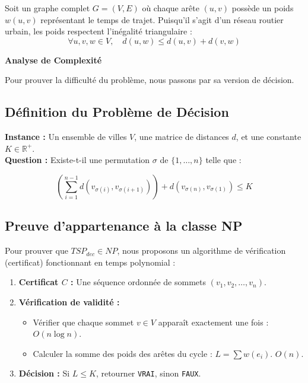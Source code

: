\noindent Soit un graphe complet $G = (V, E)$ où chaque arête $(u, v)$ possède un poids $w(u, v)$ représentant le temps de trajet. Puisqu'il s'agit d'un réseau routier urbain, les poids respectent l'inégalité triangulaire :
\begin{equation}
    \forall u, v, w \in V, \quad d(u, w) \le d(u, v) + d(v, w)
\end{equation}

\noindent \textbf{Analyse de Complexité}

\noindent Pour prouver la difficulté du problème, nous passons par sa version de décision.

\subsection*{Définition du Problème de Décision}
{}

\noindent \textbf{Instance :} Un ensemble de villes $V$, une matrice de distances $d$, et une constante $K \in \mathbb{R}^+$. \\

\noindent \textbf{Question :} Existe-t-il une permutation $\sigma$ de $\{1, \dots, n\}$ telle que :

\begin{equation}
    \left( \sum_{i=1}^{n-1} d(v_{\sigma(i)}, v_{\sigma(i+1)}) \right) + d(v_{\sigma(n)}, v_{\sigma(1)}) \le K
\end{equation}

\subsection*{Preuve d'appartenance à la classe NP}
{}

\noindent Pour prouver que $TSP_{dec} \in NP$, nous proposons un algorithme de vérification (certificat) fonctionnant en temps polynomial :

\vspace{0.5cm}

\begin{tcolorbox}[title={Algorithme de Vérification $A(I, C)$}]
\begin{enumerate}
    \item \textbf{Certificat $C$ :} Une séquence ordonnée de sommets $(v_1, v_2, \dots, v_n)$.
    \item \textbf{Vérification de validité :} 
    \begin{itemize}
        \item Vérifier que chaque sommet $v \in V$ apparaît exactement une fois : $O(n \log n)$.
        \item Calculer la somme des poids des arêtes du cycle : $L = \sum w(e_i)$. $O(n)$.
    \end{itemize}
    \item \textbf{Décision :} Si $L \le K$, retourner \texttt{VRAI}, sinon \texttt{FAUX}.
\end{enumerate}
\end{tcolorbox}

